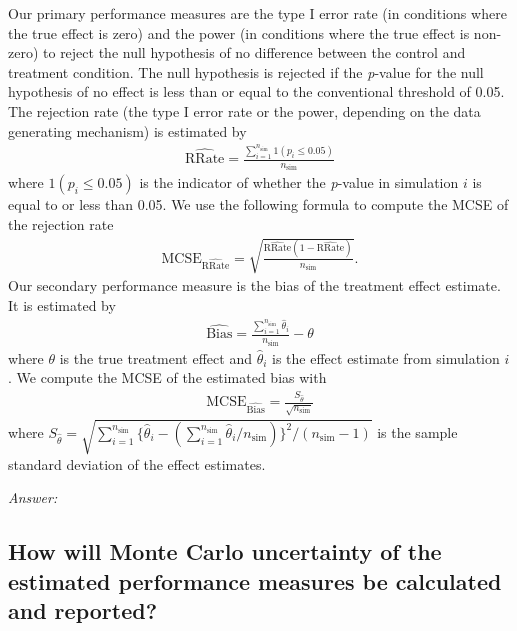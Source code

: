 \documentclass[12pt]{article}
\begin{document}
\begin{examplebox}
Our primary performance measures are the type I error rate (in conditions where the true effect is zero) and the power (in conditions where the true effect is non-zero) to reject the null hypothesis of no difference between the control and treatment condition. The null hypothesis is rejected if the \textit{p}-value for the null hypothesis of no effect is less than or equal to the conventional threshold of 0.05. The rejection rate (the type I error rate or the power, depending on the data generating mechanism) is estimated by
\begin{align*}
   \widehat{\text{RRate}} = \frac{\sum_{i=1}^{n_{\text{sim}}} 1(p_i \leq 0.05)}{n_{\text{sim}}}
\end{align*}
where $1(p_i \leq 0.05)$ is the indicator of whether the \textit{p}-value in simulation $i$ is equal to or less than 0.05. We use the following formula to compute the MCSE of the rejection rate
\begin{align*}
    \text{MCSE}_{\widehat{\text{RRate}}} = \sqrt{\frac{\widehat{\text{RRate}} (1 - \widehat{\text{RRate}})}{n_{\text{sim}}}}.
\end{align*}
Our secondary performance measure is the bias of the treatment effect estimate. It is estimated by
\begin{align*}
   \widehat{\text{Bias}} = \frac{\sum_{i=1}^{n_{\text{sim}}} \hat{\theta}_i}{n_{\text{sim}}} - \theta
\end{align*}
where $\theta$ is the true treatment effect and $\hat{\theta}_i$ is the effect estimate from simulation $i$. We compute the MCSE of the estimated bias with
\begin{align*}
    \text{MCSE}_{\widehat{\text{Bias}}} = \frac{S_{\hat{\theta}}}{\sqrt{n_{\text{sim}}}}
\end{align*}
where $S_{\hat{\theta}} = \sqrt{\sum_{i=1}^{n_{\text{sim}}}{ \{\hat{\theta}_i - (\sum_{i=1}^{n_{\text{sim}}}\hat{\theta}_i/n_{\text{sim}})\}^2}/(n_{\text{sim}} - 1)}$ is the sample standard deviation of the effect estimates.
\end{examplebox}

\textit{Answer:}

\subsection{How will Monte Carlo uncertainty of the estimated performance measures be calculated and reported?}
\end{document}
